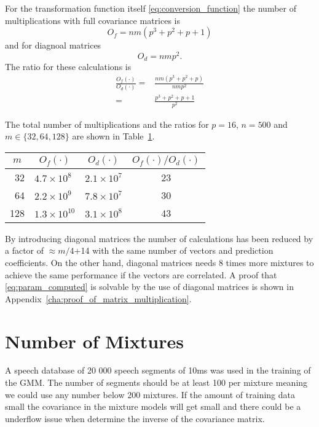 For the transformation function itself \eqref{eq:conversion_function} the number of multiplications with full covariance matrices is
\begin{equation}
	O_f = nm(p^3 + p^2 + p+1)
\end{equation}
and for diagnoal matrices
\begin{equation}
	O_d = nmp^2.
\end{equation}
The ratio for these calculations is
\begin{equation}
	\begin{split}
		\frac{O_f(\cdot)}{O_d(\cdot)} = & \frac{nm(p^3 + p^2 + p)}{nmp^2} \\
		= & \frac{p^3 + p^2 + p+1}{p^2}
	\end{split}
\end{equation}

The total number of multiplications and the ratios for $p=16$, $n=500$ and $m\in \{32,64,128\}$ are shown in Table~\ref{tab:derivation_complexity}. 
\begin{table}[ht]
	\begin{center}
		\begin{tabular}{rllc}
			\toprule
			\multicolumn{1}{c}{$m$} & \multicolumn{1}{c}{$O_f(\cdot)$} & \multicolumn{1}{c}{$O_d(\cdot)$} & \multicolumn{1}{c}{$O_f(\cdot)/O_d(\cdot)$} \\
			\midrule
			32 & $4.7 \times 10^8$ & $2.1 \times 10^7$ & 23  \\
			64 & $2.2 \times 10^9$ & $7.8 \times 10^7$ & 30  \\
			128 & $1.3 \times 10^{10}$ & $3.1 \times 10^8$ & 43  \\
			\bottomrule			
		\end{tabular}		
	\end{center}
\label{tab:derivation_complexity}	
\end{table}

By introducing diagonal matrices the number of calculations has been reduced by a factor of $\approx m/4$+14 with the same number of vectors and prediction coefficients. On the other hand, diagonal matrices needs 8 times more mixtures to achieve the same performance \cite{stylianou98} if the vectors are correlated. A proof that \eqref{eq:param_computed} is solvable by the use of diagonal matrices is shown in Appendix~\ref{cha:proof_of_matrix_multiplication}. 

\section{Number of Mixtures} %
\label{sec:number_of_mixture}
A speech database of 20 000 speech segments of 10ms was used in the training of the GMM. The number of segments should be at least 100 per mixture meaning we could use any number below 200 mixtures. If the amount of training data small the covariance in the mixture models will get small and there could be a underflow issue when determine the inverse of the covariance matrix.

